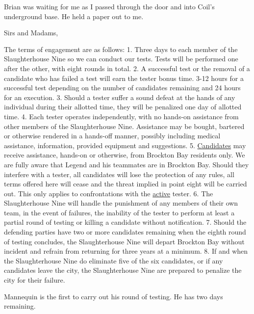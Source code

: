 





Brian was waiting for me as I passed through the door and into Coil's underground base.  He held a paper out to me.



Sirs and Madams,



The terms of engagement are as follows:
1.  Three days to each member of the Slaughterhouse Nine so we can conduct our tests.  Tests will be performed one after the other, with eight rounds in total.
2.  A successful test or the removal of a candidate who has failed a test will earn the tester bonus time.  3-12 hours for a successful test depending on the number of candidates remaining and 24 hours for an execution.
3.  Should a tester suffer a sound defeat at the hands of any individual during their allotted time, they will be penalized one day of allotted time.
4.  Each tester operates independently, with no hands-on assistance from other members of the Slaughterhouse Nine.  Assistance may be bought, bartered or otherwise rendered in a hands-off manner, possibly including medical assistance, information, provided equipment and suggestions.
5.  \underline{Candidates} may receive assistance, hands-on or otherwise, from Brockton Bay residents only.  We are fully aware that Legend and his teammates are in Brockton Bay.  Should they interfere with a tester, all candidates will lose the protection of any rules, all terms offered here will cease and the threat implied in point eight will be carried out.  This only applies to confrontations with the \underline{active} tester.
6.  The Slaughterhouse Nine will handle the punishment of any members of their own team, in the event of failures, the inability of the tester to perform at least a partial round of testing or killing a candidate without notification.
7.  Should the defending parties have two or more candidates remaining when the eighth round of testing concludes, the Slaughterhouse Nine will depart Brockton Bay without incident and refrain from returning for three years at a minimum.
8.  If and when the Slaughterhouse Nine do eliminate five of the six candidates, or if any candidates leave the city, the Slaughterhouse Nine are prepared to penalize the city for their failure.



Mannequin is the first to carry out his round of testing.  He has two days remaining.




